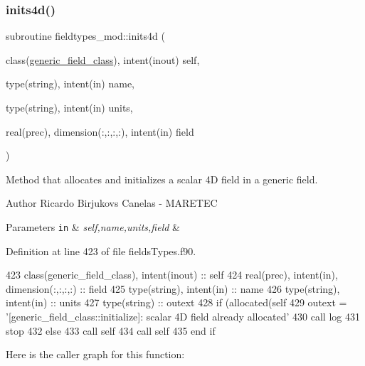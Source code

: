 \subsubsection{\texorpdfstring{inits4d()}{inits4d()}}
{\footnotesize\ttfamily subroutine fieldtypes\+\_\+mod\+::inits4d (\begin{DoxyParamCaption}\item[{class(\mbox{\hyperlink{structfieldtypes__mod_1_1generic__field__class}{generic\+\_\+field\+\_\+class}}), intent(inout)}]{self,  }\item[{type(string), intent(in)}]{name,  }\item[{type(string), intent(in)}]{units,  }\item[{real(prec), dimension(\+:,\+:,\+:,\+:), intent(in)}]{field }\end{DoxyParamCaption})\hspace{0.3cm}{\ttfamily [private]}}



Method that allocates and initializes a scalar 4D field in a generic field. 

\begin{DoxyAuthor}{Author}
Ricardo Birjukovs Canelas -\/ M\+A\+R\+E\+T\+EC 
\end{DoxyAuthor}

\begin{DoxyParams}[1]{Parameters}
\mbox{\tt in}  & {\em self,name,units,field} & \\
\hline
\end{DoxyParams}


Definition at line 423 of file fields\+Types.\+f90.


\begin{DoxyCode}
423     \textcolor{keywordtype}{class}(generic\_field\_class), \textcolor{keywordtype}{intent(inout)} :: self
424     \textcolor{keywordtype}{real(prec)}, \textcolor{keywordtype}{intent(in)}, \textcolor{keywordtype}{dimension(:,:,:,:)} :: field
425     \textcolor{keywordtype}{type}(string), \textcolor{keywordtype}{intent(in)} :: name
426     \textcolor{keywordtype}{type}(string), \textcolor{keywordtype}{intent(in)} :: units
427     \textcolor{keywordtype}{type}(string) :: outext
428     \textcolor{keywordflow}{if} (\textcolor{keyword}{allocated}(self%
429         outext = \textcolor{stringliteral}{'[generic\_field\_class::initialize]: scalar 4D field already allocated'}
430         \textcolor{keyword}{call }log%
431         stop
432     \textcolor{keywordflow}{else}
433         \textcolor{keyword}{call }self%
434         \textcolor{keyword}{call }self%
435 \textcolor{keywordflow}{    end if}
\end{DoxyCode}
Here is the caller graph for this function\+:
\mbox{\label{namespacefieldtypes__mod_a96ff5318da6a7db8bb61c525315c1c89}} 
